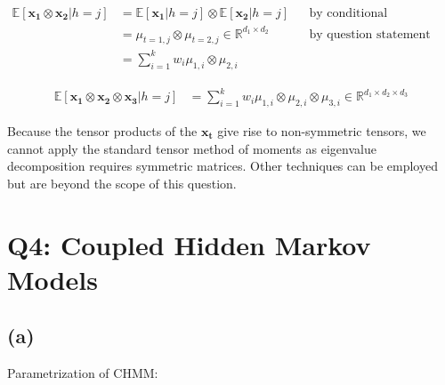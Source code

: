 \documentclass[11pt]{amsart}
\newcommand{\vek}[1]{\mathbf{#1}}
\begin{document}
\begin{equation}
\begin{aligned}
\mathbb{E}[\vek{x_1} \otimes \vek{x_2} \vert h=j] &= \mathbb{E}[\vek{x_1} \vert h=j] \otimes \mathbb{E}[\vek{x_2} \vert h=j] && \text{by conditional independence} \\
								           &= \mu_{t=1, j} \otimes \mu_{t=2, j}  \in \mathbb{R}^{d_1 \times d_2}&& \text{by question statement}\\
								           &= \sum_{i=1}^k w_i \mu_{1,i} \otimes \mu_{2, i}
\end{aligned}
\end{equation}

\begin{equation}
\begin{aligned}
\mathbb{E}[\vek{x_1} \otimes \vek{x_2} \otimes \vek{x_3} \vert h=j] &= \sum_{i=1}^k w_i \mu_{1,i} \otimes \mu_{2, i} \otimes \mu_{3, i} \in \mathbb{R}^{d_1 \times d_2 \times d_3}
\end{aligned}
\end{equation}

Because the tensor products of the $\vek{x_t}$ give rise to non-symmetric tensors, we cannot apply the standard tensor method of moments as eigenvalue decomposition requires symmetric matrices. Other techniques can be employed but are beyond the scope of this question.

\section{Q4: Coupled Hidden Markov Models}

\subsection{(a)}

Parametrization of CHMM:
\end{document}
